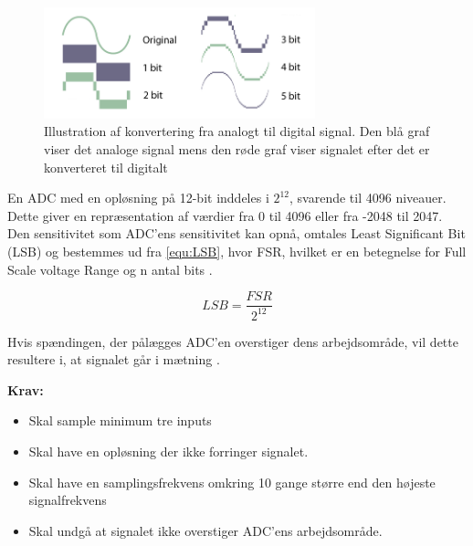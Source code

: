 \begin{figure}[H]
\centering
\includegraphics[width=0.7\textwidth]{figures/problemloesning/ADC_bit}
\caption{Illustration af konvertering fra analogt til digital signal. Den blå graf viser det analoge signal mens den røde graf viser signalet efter det er konverteret til digitalt}
\label{fig:ADC_bit}
\end{figure}

En ADC med en opløsning på 12-bit inddeles i ${2}^{12}$, svarende til 4096 niveauer. Dette giver en repræsentation af værdier fra 0 til 4096 eller fra -2048 til 2047.  Den sensitivitet som ADC'ens sensitivitet kan opnå, omtales Least Significant Bit (LSB) og bestemmes ud fra \autoref{equ:LSB}, hvor FSR, hvilket er en betegnelse for Full Scale voltage Range og n antal bits \citep{webster1998, wolf2004}.

\begin{equation} \label{equ:LSB}
LSB=\dfrac{FSR}{2^{12}}
\end{equation}

\noindent
Hvis spændingen, der pålægges ADC'en overstiger dens arbejdsområde, vil dette resultere i, at signalet går i mætning \citep{webster1998, wolf2004}. 

\vspace{3mm}
\textbf{Krav:}
\begin{itemize}
\item Skal sample minimum tre inputs 
\item Skal have en opløsning der ikke forringer signalet.
\item Skal have en samplingsfrekvens omkring 10 gange større end den højeste signalfrekvens
\item Skal undgå at signalet ikke overstiger ADC'ens arbejdsområde.
\end{itemize}

